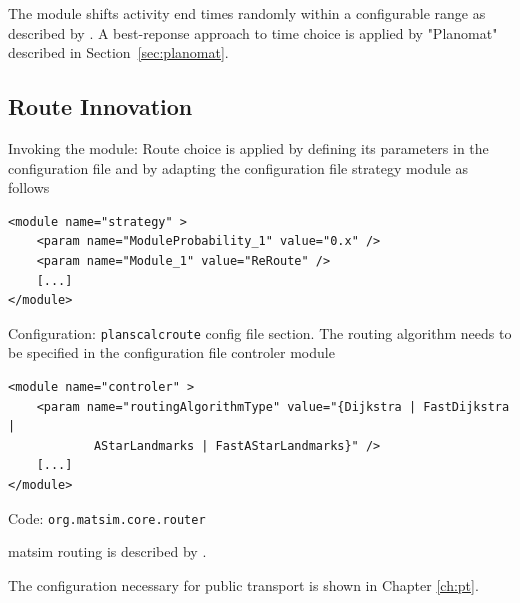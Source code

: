 The module shifts activity end times randomly within a configurable range as described by \citet[][]{BalmerEtAl_Timmermans_2005, Raney_PhDThesis_2005, Balmer_unpub_VSP_2004, BalmerEtAl_unpub_EIRASS_2004, BalmerEtAl_unpub_STRC_2004}. A best-reponse approach to time choice is applied by "Planomat" described in Section~\ref{sec:planomat}.

\subsection{Route Innovation}
\label{sec:routechoice}
\begin{compactitem}
\item Invoking the module: Route choice is applied by defining its parameters in the configuration file and by adapting the configuration file strategy module as follows
%
\begin{lstlisting}
<module name="strategy" >
    <param name="ModuleProbability_1" value="0.x" />
    <param name="Module_1" value="ReRoute" />
    [...]
</module>
\end{lstlisting}
%
\item Configuration: \lstinline|planscalcroute| config file section. The routing algorithm needs to be specified in the configuration file controler module
%
\begin{lstlisting}
<module name="controler" >
    <param name="routingAlgorithmType" value="{Dijkstra | FastDijkstra |
    		AStarLandmarks | FastAStarLandmarks}" />
    [...]
</module>
\end{lstlisting}
\item Code: \lstinline|org.matsim.core.router|
\end{compactitem}
%
\gls{matsim} routing is described by \citet[]{LefebvreBalmer_STRC_2007, LefebvreBalmer_TechRep_IVT_2007}. 

The configuration necessary for public transport is shown in Chapter \ref{ch:pt}.  


